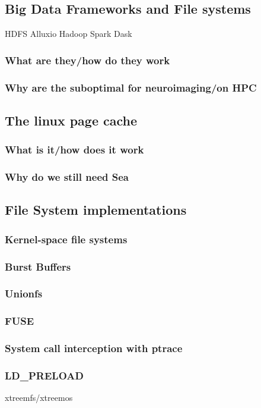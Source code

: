 \documentclass[10pt,journal,compsoc]{IEEEtran}
\begin{document}
\subsection{Big Data Frameworks and File systems}
HDFS Alluxio Hadoop Spark Dask
\subsubsection{What are they/how do they work}
\subsubsection{Why are the suboptimal for neuroimaging/on HPC}
\subsection{The linux page cache}
\subsubsection{What is it/how does it work}
\subsubsection{Why do we still need Sea}
\subsection{File System implementations}
\subsubsection{Kernel-space file systems}
\subsubsection{Burst Buffers}
\subsubsection{Unionfs}
\subsubsection{FUSE}
\subsubsection{System call interception with ptrace}
\subsubsection{LD\_PRELOAD}
xtreemfs/xtreemos
\end{document}
